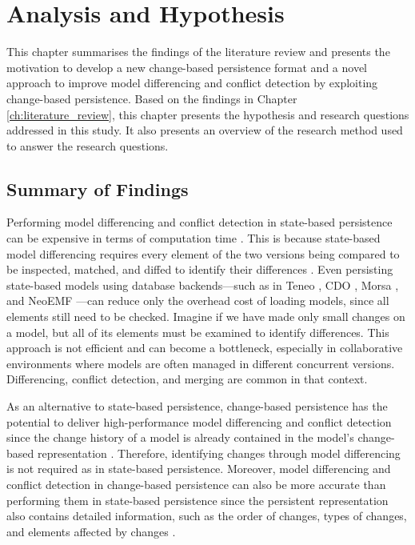 \chapter{Analysis and Hypothesis}
\label{ch:analysis_and_hypothesis}

This chapter summarises the findings of the literature review and presents the motivation to develop a new change-based persistence format and a novel approach to improve model differencing and conflict detection by exploiting change-based persistence. Based on the findings in Chapter \ref{ch:literature_review}, this chapter presents the hypothesis and research questions addressed in this study. It also presents an overview of the research method used to answer the research questions.

\section{Summary of Findings}
\label{sec:a_new_change_based_persistence}

Performing model differencing and conflict detection in state-based persistence can be expensive in terms of computation time \cite{DBLP:conf/edoc/KoegelHLHD10}. This is because state-based model differencing requires every element of the two versions being compared to be inspected, matched, and diffed to identify their differences \cite{emfcompare2018developer}. Even persisting state-based models using database backends—such as in Teneo \cite{eclipse2017teneo}, CDO \cite{eclipse2019cdo}, Morsa \cite{DBLP:conf/models/Espinazo-PaganCM11}, and NeoEMF \cite{daniel2016neoemf}—can reduce only the overhead cost of loading models, since all elements still need to be checked. Imagine if we have made only small changes on a model, but all of its elements must be examined to identify differences. This approach is not efficient and can become a bottleneck, especially in collaborative environments where models are often managed in different concurrent versions. Differencing, conflict detection, and merging are common in that context.

As an alternative to state-based persistence, change-based persistence has the potential to deliver high-performance model differencing and conflict detection since the change history of a model is already contained in the model’s change-based representation \cite{DBLP:conf/sde/LippeO92,DBLP:conf/caise/IgnatN05,koegel2010emfstore}. Therefore, identifying changes through model differencing is not required as in state-based persistence. Moreover, model differencing and conflict detection in change-based persistence can also be more accurate than performing them in state-based persistence since the persistent representation also contains detailed information, such as the order of changes, types of changes, and elements affected by changes \cite{DBLP:journals/entcs/RobbesL07,DBLP:conf/sde/LippeO92,DBLP:conf/caise/IgnatN05,mens2002state}.

